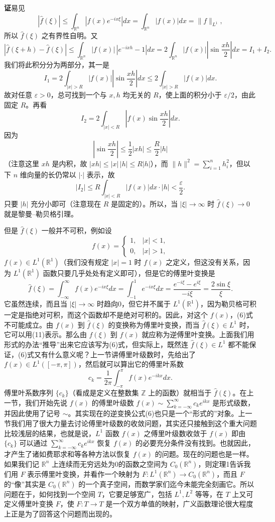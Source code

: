 \noindent\textbf{证}\quad 易见
\[
 |\widehat f(\xi)|\le\int_{\mathbb R^n}|f(x)e^{-ix\xi}|dx
 =\int_{\mathbb R^n}|f(x)|dx=\|f\|_{L^1},
\]
所以 $\widehat f(\xi)$ 之有界性自明。又
\[
 |\widehat f(\xi+h)-\widehat f(\xi)|
 \le\int_{\mathbb R^n}|f(x)|\,|e^{-ixh}-1|dx
 =2\int_{\mathbb R^n}|f(x)|\left|\sin\frac{xh}{2}\right|dx=I_1+I_2.
\]
我们将此积分分为两部分，其一是
\[
 I_1=2\int_{|x|>R}|f(x)|\left|\sin\frac{xh}{2}\right|dx
 \le2\int_{|x|>R}|f(x)|dx.
\]
故对任意 $\varepsilon>0$，总可找到一个与 $x,h$ 均无关的 $R$，使上面的积分小于 $\varepsilon/2$，由此固定 $R$。再看
\[
 I_2=2\int_{|x|<R}|f(x)\sin\frac{xh}{2}|dx.
\]
因为
\[
 \left|\sin\frac{xh}{2}\right|\le\frac12|xh|\le\frac R2|h|
\]
（注意这里 $xh$ 是内积，故 $|xh|\le|x|\,|h|\le R|h|$），而 $\|h\|^2=\sum_{i=1}^nh_i^2$，但以下 $n$ 维向量的长仍常以 $|\cdot|$ 表示，故
\[
 |I_2|\le R\int_{|x|<R}|f(x)|dx\cdot|h|<\frac\varepsilon2.
\]
只要 $|h|$ 充分小即可（注意现在 $R$ 是固定的）。所以，当 $|\xi|\to\infty$ 时 $\widehat f(\xi)\to0$ 就是黎曼--勒贝格引理。

但是 $\widehat f(\xi)$ 一般并不可积，例如设
\[
 f(x)=\begin{cases}1,&|x|<1,\\0,&|x|>1,
 \end{cases}
\]
$f(x)\in L^1(\mathbb R^1)$（我们没有规定 $|x|=1$ 时 $f(x)$ 之定义，但这没有关系，因为 $L^1(\mathbb R^1)$ 函数只要几乎处处有定义即可），但是它的傅里叶变换是
\begin{equation}
 \widehat f(\xi)=\int_{-\infty}^{\infty}f(x)e^{-ix\xi}dx
 =\int_{-1}^{1}e^{-ix\xi}dx
 =\frac{e^{-i\xi}-e^{i\xi}}{-i\xi}=\frac{2\sin\xi}{\xi}.
 \tag{13}
\end{equation}
它虽然连续，而且当 $|\xi|\to\infty$ 时趋向0，但它并不属于 $L^1(\mathbb R^1)$，因为勒贝格可积一定是指绝对可积，而这个函数却不是绝对可积的。因此，对这个 $f(x)$，(6)式不可能成立。由 $f(x)$ 到 $\widehat f(\xi)$ 的变换称为傅里叶变换，而当 $\widehat f(\xi)\in L^1$ 时，它可以用(11)表示。那么由 $\widehat f(\xi)$ 到 $f(x)$ 就应称为逆傅里叶变换。上面我们用形式的办法“推导”出来它应该写为(6)式，但实际上，既然连 $\widehat f(\xi)\in L^1$ 都不能保证，(6)式又有什么意义呢？上一节讲傅里叶级数时，先给出了 $f(x)\in L^1([ -\pi,\pi])$，然后就可以算出它的傅里叶系数
\[
 c_k=\frac1{2\pi}\int_{-\pi}^{\pi}f(x)e^{-ikx}dx.
\]
傅里叶系数序列 $\{c_k\}$（看成是定义在整数集 $\mathbb Z$ 上的函数）就相当于 $\widehat f(\xi)$。在上一节，我们开始先说 $f(x)$ 的傅里叶级数 $f(x)\sim\sum_{k=-\infty}^{\infty}c_ke^{ikx}$ 是形式级数，并因此使用了记号 $\sim$。其实现在的逆变换公式(6)也只是一个“形式的”对象。上一节我们用了很大力量去讨论傅里叶级数的收敛问题，其实还只接触到这个重大问题比较浅层的结果，也就是说，$L^1$ 函数 $f(x)$ 之傅里叶级数收敛于 $f(x)$ 即由 $\{c_k\}$ 可以通过 $\sum_{k=-\infty}^{\infty}c_ke^{ikx}$ 恢复 $f(x)$ 的必要充分条件没有找到。也就因此，才产生了诸如费耶求和等各种方法以恢复 $f(x)$ 的问题。现在的问题也是一样。如果我们记 $\mathbb R^n$ 上连续而无穷远处为0的函数之空间为 $C_0(\mathbb R^n)$，则定理1告诉我们用 $F$ 表示傅里叶变换，并看作一个映射为 $F:L^1(\mathbb R^n)\to C_0(\mathbb R^n)$，而且 $F$ 的“像”其实是 $C_0(\mathbb R^n)$ 的一个真子空间，而数学家们迄今未能完全刻画它。所以问题在于，如何找到一个空间 $T$，它要足够宽广，包括 $L^1,L^2$ 等等，在 $T$ 上又可定义傅里叶变换 $F$，使 $F:T\to T$ 是一个双方单值的映射，广义函数理论很大程度上正是为了回答这个问题而出现的。

